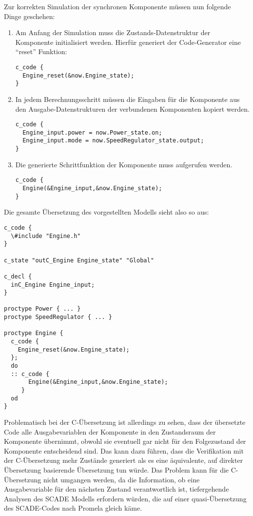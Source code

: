 Zur korrekten Simulation der synchronen Komponente müssen nun folgende Dinge geschehen:
\begin{enumerate}
\item Am Anfang der Simulation muss die Zustands-Datenstruktur der Komponente initialisiert werden.
  Hierfür generiert der Code-Generator eine "`reset"' Funktion:
  \begin{lstlisting}[language=promela]
c_code {
  Engine_reset(&now.Engine_state);
}
  \end{lstlisting}
\item In jedem Berechnungsschritt müssen die Eingaben für die Komponente aus den Aus\-ga\-be-Da\-ten\-struk\-tu\-ren der verbundenen Komponenten kopiert werden.
  \begin{lstlisting}[language=promela]
c_code {
  Engine_input.power = now.Power_state.on;
  Engine_input.mode = now.SpeedRegulator_state.output;
}
  \end{lstlisting}
\item Die generierte Schrittfunktion der Komponente muss aufgerufen werden.
  \begin{lstlisting}[language=promela]
c_code {
  Engine(&Engine_input,&now.Engine_state);
}
  \end{lstlisting}
\end{enumerate}
Die gesamte Übersetzung des vorgestellten Modells sieht also so aus:
\begin{lstlisting}[language=promela,caption={C-Integration-Beispiel}]
c_code {
  \#include "Engine.h"
}

c_state "outC_Engine Engine_state" "Global"

c_decl {
  inC_Engine Engine_input;
}

proctype Power { ... }
proctype SpeedRegulator { ... }

proctype Engine {
  c_code {
    Engine_reset(&now.Engine_state);
  };
  do
  :: c_code {
       Engine(&Engine_input,&now.Engine_state);
     }
  od
}
\end{lstlisting}
Problematisch bei der C-Übersetzung ist allerdings zu sehen, dass der übersetzte Code alle Ausgabevariablen der Komponente in den Zustandsraum der Komponente übernimmt, obwohl sie eventuell gar nicht für den Folgezustand der Komponente entscheidend sind.
Das kann dazu führen, dass die Verifikation mit der C-Übersetzung mehr Zustände generiert als es eine äquivalente, auf direkter Übersetzung basierende Übersetzung tun würde.
Das Problem kann für die C-Übersetzung nicht umgangen werden, da die Information, ob eine Ausgabevariable für den nächsten Zustand verantwortlich ist, tiefergehende Analysen des SCADE Modells erfordern würden, die auf einer quasi-Übersetzung des SCADE-Codes nach Promela gleich käme.